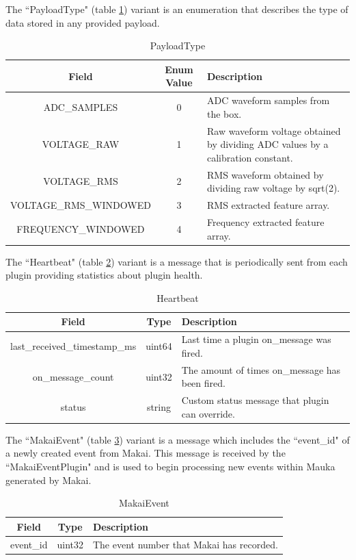 The ``PayloadType" (table \ref{table:PayloadType}) variant is an enumeration that describes the type of data stored in any provided payload.

\begin{table}[H]
	\centering
	\caption{PayloadType}
	\begin{tabular}{|c|c| p{8cm} |}
		\hline 
		Field & Enum Value & Description  \\ 
		\hline 
		ADC\_SAMPLES & 0 & ADC waveform samples from the box.  \\ 
		\hline 
		VOLTAGE\_RAW & 1 & Raw waveform voltage obtained by dividing ADC values by a calibration constant. \\ 
		\hline
		VOLTAGE\_RMS & 2 & RMS waveform obtained by dividing raw voltage by sqrt(2). \\
		\hline 
		VOLTAGE\_RMS\_WINDOWED & 3 & RMS extracted feature array. \\ 
		\hline
		FREQUENCY\_WINDOWED & 4 & Frequency extracted feature array. \\
		\hline 
	\end{tabular} 
	\label{table:PayloadType}
\end{table}

The ``Heartbeat" (table \ref{table:Heartbeat}) variant is a message that is periodically sent from each plugin providing statistics about plugin health. 

\begin{table}[H]
	\centering
	\caption{Heartbeat}
	\begin{tabular}{|c|c|p{8cm}|}
		\hline 
		Field & Type & Description  \\ 
		\hline 
		last\_received\_timestamp\_ms & uint64 & Last time a plugin on\_message was fired.  \\ 
		\hline 
		on\_message\_count & uint32 & The amount of times on\_message has been fired. \\ 
		\hline 
		status & string & Custom status message that plugin can override. \\ 
		\hline 
	\end{tabular} 
	\label{table:Heartbeat}
\end{table}

The ``MakaiEvent" (table \ref{table:MakaiEvent}) variant is a message which includes the ``event\_id" of a newly created event from Makai. This message is received by the ``MakaiEventPlugin" and is used to begin processing new events within Mauka generated by Makai.

\begin{table}[H]
	\centering
	\caption{MakaiEvent}
	\begin{tabular}{|c|c|p{8cm}|}
		\hline 
		Field & Type & Description  \\ 
		\hline 
		event\_id & uint32 & The event number that Makai has recorded.  \\ 
		\hline 
	\end{tabular} 
	\label{table:MakaiEvent}
\end{table}

